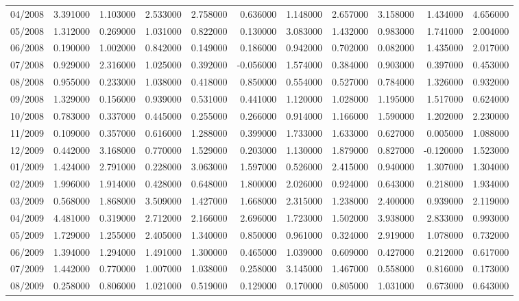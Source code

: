 \begin{tabular}{lrrrrrrrrrr}
04/2008 & 3.391000 & 1.103000 & 2.533000 & 2.758000 & 0.636000 & 1.148000 & 2.657000 & 3.158000 & 1.434000 & 4.656000 \\
05/2008 & 1.312000 & 0.269000 & 1.031000 & 0.822000 & 0.130000 & 3.083000 & 1.432000 & 0.983000 & 1.741000 & 2.004000 \\
06/2008 & 0.190000 & 1.002000 & 0.842000 & 0.149000 & 0.186000 & 0.942000 & 0.702000 & 0.082000 & 1.435000 & 2.017000 \\
07/2008 & 0.929000 & 2.316000 & 1.025000 & 0.392000 & -0.056000 & 1.574000 & 0.384000 & 0.903000 & 0.397000 & 0.453000 \\
08/2008 & 0.955000 & 0.233000 & 1.038000 & 0.418000 & 0.850000 & 0.554000 & 0.527000 & 0.784000 & 1.326000 & 0.932000 \\
09/2008 & 1.329000 & 0.156000 & 0.939000 & 0.531000 & 0.441000 & 1.120000 & 1.028000 & 1.195000 & 1.517000 & 0.624000 \\
10/2008 & 0.783000 & 0.337000 & 0.445000 & 0.255000 & 0.266000 & 0.914000 & 1.166000 & 1.590000 & 1.202000 & 2.230000 \\
11/2009 & 0.109000 & 0.357000 & 0.616000 & 1.288000 & 0.399000 & 1.733000 & 1.633000 & 0.627000 & 0.005000 & 1.088000 \\
12/2009 & 0.442000 & 3.168000 & 0.770000 & 1.529000 & 0.203000 & 1.130000 & 1.879000 & 0.827000 & -0.120000 & 1.523000 \\
01/2009 & 1.424000 & 2.791000 & 0.228000 & 3.063000 & 1.597000 & 0.526000 & 2.415000 & 0.940000 & 1.307000 & 1.304000 \\
02/2009 & 1.996000 & 1.914000 & 0.428000 & 0.648000 & 1.800000 & 2.026000 & 0.924000 & 0.643000 & 0.218000 & 1.934000 \\
03/2009 & 0.568000 & 1.868000 & 3.509000 & 1.427000 & 1.668000 & 2.315000 & 1.238000 & 2.400000 & 0.939000 & 2.119000 \\
04/2009 & 4.481000 & 0.319000 & 2.712000 & 2.166000 & 2.696000 & 1.723000 & 1.502000 & 3.938000 & 2.833000 & 0.993000 \\
05/2009 & 1.729000 & 1.255000 & 2.405000 & 1.340000 & 0.850000 & 0.961000 & 0.324000 & 2.919000 & 1.078000 & 0.732000 \\
06/2009 & 1.394000 & 1.294000 & 1.491000 & 1.300000 & 0.465000 & 1.039000 & 0.609000 & 0.427000 & 0.212000 & 0.617000 \\
07/2009 & 1.442000 & 0.770000 & 1.007000 & 1.038000 & 0.258000 & 3.145000 & 1.467000 & 0.558000 & 0.816000 & 0.173000 \\
08/2009 & 0.258000 & 0.806000 & 1.021000 & 0.519000 & 0.129000 & 0.170000 & 0.805000 & 1.031000 & 0.673000 & 0.643000 \\

\end{tabular}
